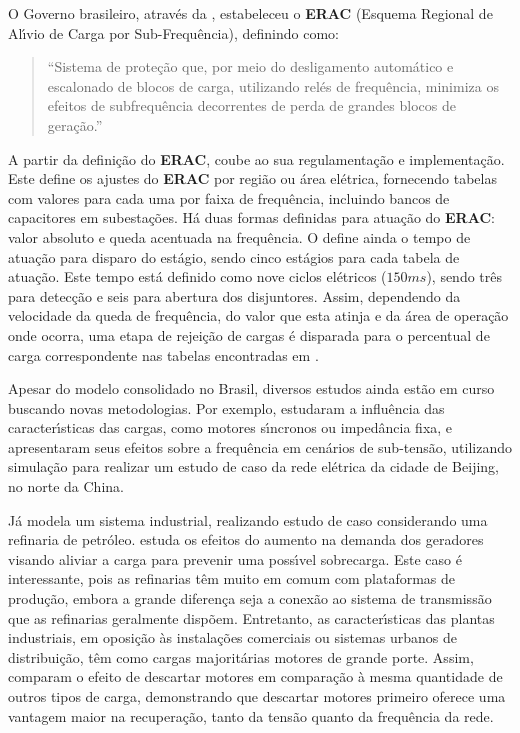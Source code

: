 O Governo brasileiro, atrav{\'e}s da , estabeleceu o \textbf{ERAC} (Esquema Regional de Al{\'\i}vio de Carga por Sub-Frequ{\^e}ncia), definindo como:

\begin{quote}
	``Sistema de prote{\c c}{\~a}o que, por meio do desligamento autom{\'a}tico e escalonado de blocos de carga, utilizando rel{\'e}s de frequ{\^e}ncia, minimiza os efeitos de subfrequ{\^e}ncia decorrentes de perda de grandes blocos de gera{\c c}{\~a}o.'' \cite[p.~156]{aneel2015}
\end{quote}

A partir da defini{\c c}{\~a}o do \textbf{ERAC}, coube ao \citeauthor{iogcbr02} sua regulamenta{\c c}{\~a}o e implementa{\c c}{\~a}o. Este define os ajustes do \textbf{ERAC} por regi{\~a}o ou {\'a}rea el{\'e}trica, fornecendo tabelas com valores para cada uma por faixa de frequ{\^e}ncia, incluindo bancos de capacitores em subesta{\c c}{\~o}es. H{\'a} duas formas definidas para atua{\c c}{\~a}o do \textbf{ERAC}: valor absoluto e queda acentuada na frequ{\^e}ncia. O  \cite[item 2.1.3]{iogcbr02} define ainda o tempo de atua{\c c}{\~a}o para disparo do est{\'a}gio, sendo cinco est{\'a}gios para cada tabela de atua{\c c}{\~a}o. Este tempo est{\'a} definido como nove ciclos el{\'e}tricos ($150ms$), sendo tr{\^e}s para detec{\c c}{\~a}o e seis para abertura dos disjuntores. Assim, dependendo da velocidade da queda de frequ{\^e}ncia, do valor que esta atinja e da {\'a}rea de opera{\c c}{\~a}o onde ocorra, uma etapa de rejei{\c c}{\~a}o de cargas {\'e} disparada para o percentual de carga correspondente nas tabelas encontradas em \cite{iogcbr02}.

Apesar do modelo consolidado no Brasil, diversos estudos ainda est{\~a}o em curso buscando novas metodologias. Por exemplo, \citeauthor{li2006} estudaram a influ{\^e}ncia das caracter{\'\i}sticas das cargas, como motores s{\'\i}ncronos ou imped{\^a}ncia fixa, e apresentaram seus efeitos sobre a frequ{\^e}ncia em cen{\'a}rios de sub-tens{\~a}o, utilizando simula{\c c}{\~a}o para realizar um estudo de caso da rede el{\'e}trica da cidade de Beijing, no norte da China.

J{\'a} \citeauthor{kucuk2018} modela um sistema industrial, realizando estudo de caso considerando uma refinaria de petr{\'o}leo.  estuda os efeitos do aumento na demanda dos geradores visando aliviar a carga para prevenir uma poss{\'\i}vel sobrecarga. Este caso {\'e} interessante, pois as refinarias t{\^e}m muito em comum com plataformas de produ{\c c}{\~a}o, embora a grande diferen{\c c}a seja a conex{\~a}o ao sistema de transmiss{\~a}o que as refinarias geralmente disp{\~o}em. Entretanto, as caracter{\'\i}sticas das plantas industriais, em oposi{\c c}{\~a}o {\`a}s instala{\c c}{\~o}es comerciais ou sistemas urbanos de distribui{\c c}{\~a}o, t{\^e}m como cargas majorit{\'a}rias motores de grande porte. Assim, \citeauthor{ye2015zhe} comparam o efeito de descartar motores em compara{\c c}{\~a}o {\`a} mesma quantidade de outros tipos de carga, demonstrando que descartar motores primeiro oferece uma vantagem maior na recupera{\c c}{\~a}o, tanto da tens{\~a}o quanto da frequ{\^e}ncia da rede.


